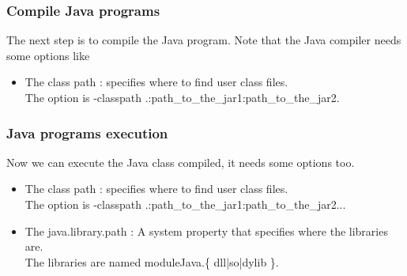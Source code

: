 \subsubsection{Compile Java programs}
The next step is to compile the Java program. Note that the Java compiler needs some options like 
\begin{itemize}
\item The class path  : specifies where to find user class files. \\
      The option is  -classpath .:path\_to\_the\_jar1:path\_to\_the\_jar2.
\end{itemize}

\subsubsection{Java programs execution}
Now we can execute the Java class compiled, it needs some options too.
\begin{itemize}
\item The class path  : specifies where to find user class files.\\
      The option is -classpath .:path\_to\_the\_jar1:path\_to\_the\_jar2...
\item The java.library.path : A system property that specifies where the libraries are.\\
      The libraries are named moduleJava.\{ dll|so|dylib \}.
\end{itemize}

